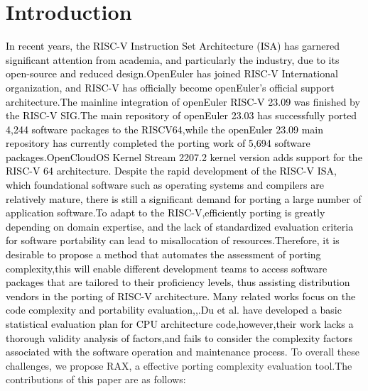 \documentclass[sigconf,screen,review,anonymous]{acmart}
\begin{document}
\section{Introduction}
\textcolor{black}{In recent years, the RISC-V Instruction Set Architecture (ISA) has garnered significant attention from academia, and particularly the industry, due to its open-source and reduced design\citep{2014The}.OpenEuler has joined RISC-V International organization, and RISC-V has officially become openEuler's official support architecture.The mainline integration of openEuler RISC-V 23.09 was finished by the RISC-V SIG.The main repository of openEuler 23.03 has successfully ported 4,244 software packages to the RISCV64,while the openEuler 23.09 main repository has currently completed the porting work of 5,694 software packages\citep{osti_1560132}.OpenCloudOS Kernel Stream 2207.2 kernel version adds support for the RISC-V 64 architecture\citep{osti_1560133}.  
   Despite the rapid development of the RISC-V ISA, which foundational software such as operating systems and compilers are relatively mature, there is still a significant demand for porting a large number of application software\citep{2019Notary}.To adapt to the RISC-V,efficiently porting is greatly depending on domain expertise, and the lack of standardized evaluation criteria for software portability can lead to misallocation of resources.Therefore, it is desirable to propose a method that automates the assessment of porting complexity,this will enable different development teams to access software packages that are tailored to their proficiency levels, thus assisting distribution vendors in the porting of RISC-V architecture.
Many related works focus on the code complexity and portability evaluation\cite{2016helei},\cite{TAHIR2016101},\cite{Sholiq_2021}.Du et al. have developed a basic statistical evaluation plan for CPU architecture code\citep{2023du},however,their work lacks a thorough validity analysis of factors,and fails to consider the complexity factors associated with the software operation and maintenance process.}
To overall these challenges, we propose RAX, a effective porting
complexity evaluation tool.The contributions of this paper are as follows:
\end{document}

